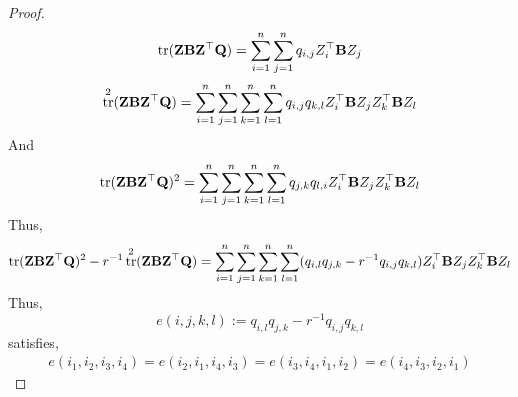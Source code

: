 \documentclass[11pt]{article}
\DeclareMathOperator{\mytr}{tr}
\theoremstyle{plain}
\theoremstyle{definition}
\theoremstyle{remark}
\begin{document}
\begin{proof}
\begin{equation*}
    \begin{split}
    \mytr( \BZ \BB \BZ^\top \BQ)
    =\sum_{i=1}^n \sum_{j=1}^n q_{i,j}  Z_{i}^\top \BB Z_{j} 
    \end{split}
\end{equation*}
\begin{equation*}
    \begin{split}
    \mytr^2( \BZ \BB \BZ^\top \BQ)
    =\sum_{i=1}^n \sum_{j=1}^n \sum_{k=1}^n \sum_{l=1}^n q_{i,j} q_{k,l}  Z_{i}^\top \BB Z_{j} Z_{k}^\top \BB Z_{l} 
    \end{split}
\end{equation*}
And
\begin{equation*}
    \begin{split}
    \mytr(\BZ \BB \BZ^\top \BQ )^2
    =
    \sum_{i=1}^n\sum_{j=1}^n \sum_{k=1}^n \sum_{l=1}^n q_{j,k} q_{l,i} Z_{i}^\top \BB Z_{j} 
      Z_{k}^\top \BB Z_{l} 
      \\
    \end{split}
\end{equation*}
Thus,
\begin{equation*}
    \begin{split}
    \mytr(\BZ \BB \BZ^\top \BQ )^2
    -r^{-1}
    \mytr^2( \BZ \BB \BZ^\top \BQ)
    =
    \sum_{i=1}^n\sum_{j=1}^n \sum_{k=1}^n \sum_{l=1}^n (q_{i,l} q_{j,k}-r^{-1}q_{i,j}q_{k,l})  Z_{i}^\top \BB Z_{j} 
      Z_{k}^\top \BB Z_{l} 
    \end{split}
\end{equation*}
Thus,
\begin{equation*}
    e(i,j,k,l):= 
q_{i,l} q_{j,k}-r^{-1}q_{i,j}q_{k,l}
\end{equation*}
satisfies,
    \begin{equation*}
        \begin{split}
            e(i_1,i_2,i_3,i_4)
            =
            e(i_2,i_1,i_4,i_3)
            =
            e(i_3,i_4,i_1,i_2)
            =
            e(i_4,i_3,i_2,i_1)
        \end{split}
    \end{equation*}
\end{proof}
\end{document}
